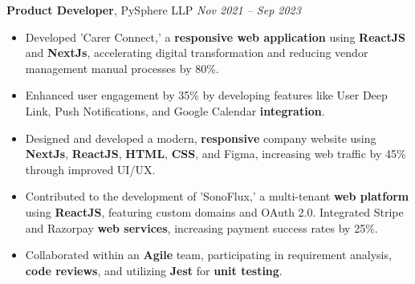 \documentclass[10pt, letterpaper]{article}
\newenvironment{highlights}{
    \begin{itemize}[
        topsep=0.10 cm,
        parsep=0.10 cm,
        partopsep=0pt,
        itemsep=0.05cm, %
        leftmargin=10pt, %
        labelwidth=!, %
        labelsep=5pt %
    ]\justifying %
}{
    \end{itemize}
}
\newenvironment{onecolentry}{
    \begin{adjustwidth}{0cm}{0cm} %
    \RaggedRight %
}{
    \end{adjustwidth}
}
\begin{document}
    \begin{onecolentry}
        \textbf{Product Developer}, PySphere LLP \hfill \textit{Nov 2021 – Sep 2023}
        \vspace{0.10 cm}
        \begin{highlights}
             \item Developed 'Carer Connect,' a \textbf{responsive web application} using \textbf{ReactJS} and \textbf{NextJs}, accelerating digital transformation and reducing vendor management manual processes by 80\%. %
            \item Enhanced user engagement by 35\% by developing features like User Deep Link, Push Notifications, and Google Calendar \textbf{integration}. %
            \item Designed and developed a modern, \textbf{responsive} company website using \textbf{NextJs}, \textbf{ReactJS}, \textbf{HTML}, \textbf{CSS}, and Figma, increasing web traffic by 45\% through improved UI/UX. %
            \item Contributed to the development of 'SonoFlux,' a multi-tenant \textbf{web platform} using \textbf{ReactJS}, featuring custom domains and OAuth 2.0. Integrated Stripe and Razorpay \textbf{web services}, increasing payment success rates by 25\%. %
             \item Collaborated within an \textbf{Agile} team, participating in requirement analysis, \textbf{code reviews}, and utilizing \textbf{Jest} for \textbf{unit testing}. %
        \end{highlights}
    \end{onecolentry}

\end{document}
